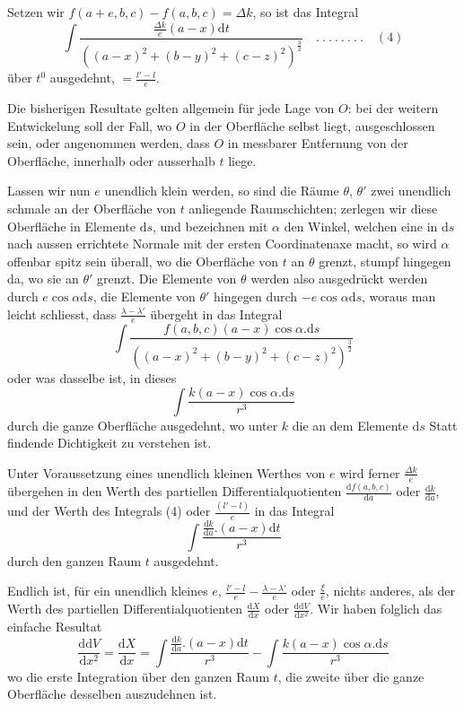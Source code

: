 Setzen wir $f(a+e,b,c)-f(a,b,c)=\Delta k$, so ist das Integral
\[
\int\frac{\frac{\Delta k}{e}(a-x)\mathrm{d}t}{((a-x)^2+(b-y)^2+(c-z)^2)^{\frac{3}{2}}}\quad .\ .\ .\ .\ .\ .\ .\ .\quad(4)
\]
über $t^0$ ausgedehnt, $=\frac{l'-l}{e}$.

Die bisherigen Resultate gelten allgemein für jede Lage von $O$: bei der weitern Entwickelung soll der Fall, wo $O$ in der Oberfläche selbst liegt, ausgeschlossen sein, oder angenommen werden, dass $O$ in messbarer Entfernung von der Oberfläche, innerhalb oder ausserhalb $t$ liege.

Lassen wir nun $e$ unendlich klein werden, so sind die Räume $\theta$, $\theta'$ zwei unendlich schmale an der Oberfläche von $t$ anliegende Raumschichten; zerlegen wir diese Oberfläche in Elemente $\mathrm{d}s$, und bezeichnen mit $\alpha$ den Winkel, welchen eine in $\mathrm{d}s$ nach aussen errichtete Normale mit der ersten Coordinatenaxe macht, so wird $\alpha$ offenbar spitz sein überall, wo die Oberfläche von $t$ an $\theta$ grenzt, stumpf hingegen da, wo sie an $\theta'$ grenzt. Die Elemente von $\theta$ werden also ausgedrückt werden durch $e\cos\alpha\mathrm{d}s$, die Elemente von $\theta'$ hingegen durch $-e\cos\alpha\mathrm{d}s$, woraus man leicht schliesst, dass $\frac{\lambda-\lambda'}{e}$ übergeht in das Integral
\[
\int\frac{f(a,b,c)(a-x)\cos\alpha.\mathrm{d}s}{((a-x)^2+(b-y)^2+(c-z)^2)^{\frac{3}{2}}}
\]
oder was dasselbe ist, in dieses
\[
\int\frac{k(a-x)\cos\alpha.\mathrm{d}s}{r^3}
\]
durch die ganze Oberfläche ausgedehnt, wo unter $k$ die an dem Elemente $\mathrm{d}s$ Statt findende Dichtigkeit zu verstehen ist.

Unter Voraussetzung eines unendlich kleinen Werthes von $e$ wird ferner $\frac{\Delta k}{e}$ übergehen in den Werth des partiellen Differentialquotienten $\frac{\mathrm{d}f(a,b,c)}{\mathrm{d}a}$ oder $\frac{\mathrm{d}k}{\mathrm{d}a}$, und der Werth des Integrals (4) oder $\frac{(l'-l)}{e}$ in das Integral
%
\[
\int\frac{\frac{\mathrm{d}k}{\mathrm{d}a}.(a-x)\mathrm{d}t}{r^3}
\]
durch den ganzen Raum $t$ ausgedehnt.

Endlich ist, für ein unendlich kleines $e$, $\frac{l'-l}{e}-\frac{\lambda-\lambda'}{e}$ oder $\frac{\xi}{e}$, nichts anderes, als der Werth des partiellen Differentialquotienten $\frac{\mathrm{d}X}{\mathrm{d}x}$ oder $\frac{\mathrm{d}\mathrm{d}V}{\mathrm{d}x^2}$. Wir haben folglich das einfache Resultat
\[
\frac{\mathrm{d}\mathrm{d}V}{\mathrm{d}x^2}=\frac{\mathrm{d}X}{\mathrm{d}x}=\int\frac{\frac{\mathrm{d}k}{\mathrm{d}a}.(a-x)\mathrm{d}t}{r^3}-\int\frac{k(a-x)\cos\alpha.\mathrm{d}s}{r^3}
\]
wo die erste Integration über den ganzen Raum $t$, die zweite über die ganze Oberfläche desselben auszudehnen ist.

